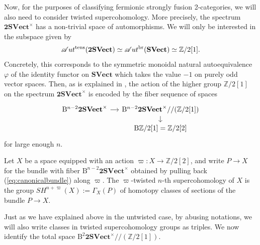 \documentclass[pdftex]{sigma}
\numberwithin{equation}{section}
\begin{document}
Now, for the purposes of classifying fermionic strongly fusion 2-categories, we will also need to consider twisted supercohomology. More precisely, the spectrum $\mathbf{2SVect}^{\times}$ has a non-trivial space of automorphisms. We will only be interested in the subspace given by
\begin{gather*}
\mathscr{A}ut^{\rm tens}(\mathbf{2SVect}) \simeq \mathscr{A}ut^{\operatorname{br}}(\mathbf{SVect})\simeq \mathbb{Z}/2[1].
\end{gather*}
 Concretely, this corresponds to the symmetric monoidal natural autoequivalence $\varphi$ of the identity functor on $\mathbf{SVect}$ which takes the value $-1$ on purely odd vector spaces. Then, as is explained in \cite[Section~4.1]{NSS}, the action of the higher group $\mathbb{Z}/2[1]$ on the spectrum $\mathbf{2SVect}^{\times}$ is encoded by the fiber sequence of spaces
 \begin{equation}\begin{tikzcd}[sep=small]
\mathrm{B}^{n-2}\mathbf{2SVect}^{\times} \arrow[r] & {\mathrm{B}^{n-2}\mathbf{2SVect}^{\times}//(\mathbb{Z}/2[1])} \arrow[d] \\
&{\mathrm{B}\mathbb{Z}/2[1]=\mathbb{Z}/2[2]}\label{eq:canonicalbundle}
\end{tikzcd}\end{equation}
 for large enough $n$.

\begin{Definition}\label{def:twistedSH}
Let $X$ be a space equipped with an action $\varpi\colon X\rightarrow \mathbb{Z}/2[2]$, and write $P\rightarrow X$ for the bundle with fiber $\mathrm{B}^{n-2}\mathbf{2SVect}^{\times}$ obtained by pulling back (\ref{eq:canonicalbundle}) along $\varpi$. The $\varpi$-twisted $n$-th supercohomology of $X$ is the group $SH^{n+\varpi}(X):=\Gamma_X(P)$ of homotopy classes of sections of the bundle $P\rightarrow X$.
\end{Definition}

Just as we have explained above in the untwisted case, by abusing notations, we will also write classes in twisted supercohomology groups as triples.
We now identify the total space $\mathrm{B}^2\mathbf{2SVect}^{\times}\allowbreak//(\mathbb{Z}/ 2[1])$.
\end{document}
